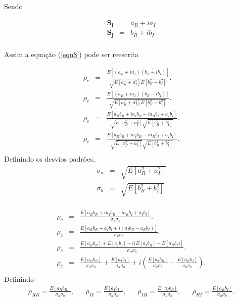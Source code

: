 Sendo 

\begin{equation}\label{eqn11}
\begin{array}{ccc}
	\mathbf{S_i}&=&a_{R}+ia_{I} \\
        \mathbf{S_j}&=&b_{R}+ib_{I} \\
\end{array}
\end{equation}

Assim a equação (\ref{eqn8}) pode ser reescrita

\begin{equation}\label{eqn12}
\begin{array}{ccc}
	\rho_c&=&\frac{E[(a_{R}+ia_{I})\overline{(b_{R}+ib_{I})}]}{\sqrt{E[a_{R}^2+a_{I}^2]E[b_{R}^2+b_{I}^2]}}. \\
	\rho_c&=&\frac{E[(a_{R}+ia_{I})(b_{R}-ib_{I})]}{\sqrt{E[a_{R}^2+a_{I}^2]E[b_{R}^2+b_{I}^2]}}. \\
	\rho_c&=&\frac{E[a_{R}b_{R}+ia_{I}b_{R}-ia_{R}b_{I}+a_{I}b_{I}]}{\sqrt{E[a_{R}^2+a_{I}^2]}\sqrt{E[b_{R}^2+b_{I}^2]}}. \\
	\rho_c&=&\frac{E[a_{R}b_{R}+ia_{I}b_{R}-ia_{R}b_{I}+a_{I}b_{I}]}{\sqrt{E[a_{R}^2+a_{I}^2]}\sqrt{E[b_{R}^2+b_{I}^2]}}. \\
\end{array}
\end{equation}
Definindo os desvios padrões,
\begin{equation}\label{eqn13}
\begin{array}{ccc}
	\sigma_{a}	&=&\sqrt{E[a_{R}^2+a_{I}^2]} \\
	\sigma_{b}      &=&\sqrt{E[b_{R}^2+b_{I}^2]} \\
\end{array}
\end{equation}

\begin{equation}\label{eqn14}
\begin{array}{ccc}
	\rho_c&=&\frac{E[a_{R}b_{R}+ia_{I}b_{R}-ia_{R}b_{I}+a_{I}b_{I}]}{\sigma_a\sigma_b}. \\
	\rho_c&=&\frac{E[a_{R}b_{R}+a_{I}b_{I}+i(a_{I}b_{R}-a_{R}b_{I})]}{\sigma_a\sigma_b}. \\
	\rho_c&=&\frac{E[a_{R}b_{R}]+E[a_{I}b_{I}]+i(E[a_{I}b_{R}]-E[a_{R}b_{I})]}{\sigma_a\sigma_b}. \\
	\rho_c&=&\frac{E[a_{R}b_{R}]}{\sigma_a\sigma_b}+\frac{E[a_{I}b_{I}]}{\sigma_a\sigma_b}+i\left(\frac{E[a_{I}b_{R}]}{\sigma_a\sigma_b}-\frac{E[a_{R}b_{I}]}{\sigma_a\sigma_b}\right). \\
\end{array}
\end{equation}
Definindo
\begin{equation}\label{eqn15}
\begin{array}{ccccccccc}
	\rho_{RR}=\frac{E[a_{R}b_{R}]}{\sigma_a\sigma_b},&&\rho_{II}=\frac{E[a_{I}b_{I}]}{\sigma_a\sigma_b},&&\rho_{IR}=\frac{E[a_{I}b_{R}]}{\sigma_a\sigma_b},&&\rho_{RI}=\frac{E[a_{R}b_{I}]}{\sigma_a\sigma_b}. \\
\end{array}
\end{equation}

